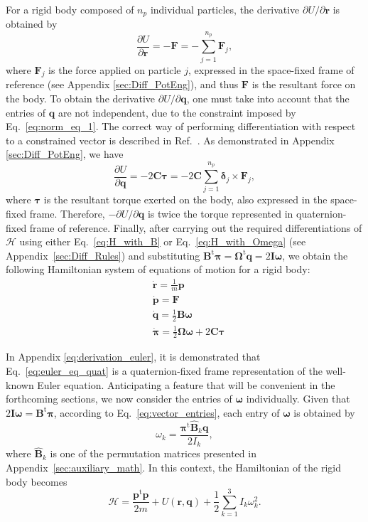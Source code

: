 \documentclass[aip,jcp,reprint,amsmath,amssymb]{revtex4-1}
\newcommand{\mt}[1]{\boldsymbol{\mathbf{#1}}}           %
\newcommand{\vt}[1]{\boldsymbol{\mathbf{#1}}}           %
\newcommand{\tr}[1]{#1^\text{t}}                        %
\newcommand{\diff}[2]{\dfrac{\partial #1}{\partial #2}} %
\begin{document}
For a rigid body composed of $n_p$ individual particles, the derivative $\partial U/\partial \vt r$ is obtained by
\[
\diff{U}{\vt r} = -\vt F = -\sum_{j=1}^{n_p} {\vt F_j},
\]
where $\vt F_j$ is the force applied on particle $j$, expressed in the space-fixed frame of reference (see Appendix \ref{sec:Diff_PotEng}), and thus $\vt F$ is the resultant force on the body. To obtain the derivative $\partial U/\partial \vt q$, one must take into account that the entries of $\vt q$ are not independent, due to the constraint imposed by Eq.~\ref{eq:norm_eq_1}. The correct way of performing differentiation with respect to a constrained vector is described in Ref.~. As demonstrated in Appendix \ref{sec:Diff_PotEng}, we have
\[
\diff{U}{\vt q} = -2 \mt C \vt \tau = -2 \mt C \sum_{j=1}^{n_p} {\vt \delta_j} \times {\vt F_j},
\]
where $\vt \tau$ is the resultant torque exerted on the body, also expressed in the space-fixed frame. Therefore, $-\partial U/\partial \vt q$ is twice the torque represented in quaternion-fixed frame of reference. Finally, after carrying out the required differentiations of $\mathcal{H}$ using either Eq.~\ref{eq:H_with_B} or Eq.~\ref{eq:H_with_Omega} (see Appendix~\ref{sec:Diff_Rules}) and substituting $\tr{\mt B} \vt \pi = \tr{\mt \Omega} \vt q = 2 {\mt I} \vt \omega$, we obtain the following Hamiltonian system of equations of motion for a rigid body:
\begin{subequations}
\label{eq:EDO_system}
\begin{align}
&\dot{\vt r} = \frac{1}{m} \vt p \\
&\dot{\vt p} = \mt F \\
&\dot{\vt q} = \frac{1}{2} \mt B \vt \omega \\
&\dot{\vt \pi} = \frac{1}{2} \mt \Omega \vt \omega + 2 \mt C \vt \tau \label{eq:euler_eq_quat}
\end{align}
\end{subequations}

In Appendix \ref{eq:derivation_euler}, it is demonstrated that Eq.~\ref{eq:euler_eq_quat} is a quaternion-fixed frame representation of the well-known Euler equation.\cite{Goldstein2002} Anticipating a feature that will be convenient in the forthcoming sections, we now consider the entries of $\vt \omega$ individually. Given that $2{\mt I}{\vt \omega} = \tr{\mt B}{\vt \pi}$, according to Eq.~\ref{eq:vector_entries}, each entry of $\vt \omega$ is obtained by
\begin{equation}
\label{eq:omega_entry}
\omega_k = \frac{\tr{\vt \pi} \hat{\mt B}_k \vt q}{2 I_k},
\end{equation}
where $\hat{\mt B}_k$ is one of the permutation matrices presented in Appendix~\ref{sec:auxiliary_math}. In this context, the Hamiltonian of the rigid body becomes
\[
\mathcal{H} = \frac{\tr{\vt p} \vt p}{2m} + U(\vt r, \vt q) + \frac{1}{2} \sum_{k=1}^3 I_k \omega_k^2.
\]
\end{document}
